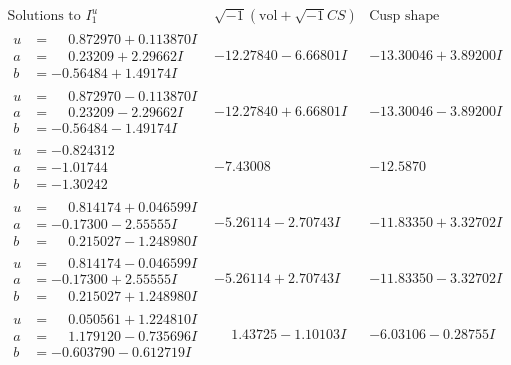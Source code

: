 \documentclass[1p]{elsarticle_modified}
\theoremstyle{definition}
\newcommand{\I}{\sqrt{-1}}
\begin{document}
$$\begin{array}{c|c|c}  
\text{Solutions to }I^u_{1}& \I (\text{vol} + \sqrt{-1}CS) & \text{Cusp shape}\\
 \hline 
\begin{aligned}
u &= \phantom{-}0.872970 + 0.113870 I \\
a &= \phantom{-}0.23209 + 2.29662 I \\
b &= -0.56484 + 1.49174 I\end{aligned}
 & -12.27840 - 6.66801 I & -13.30046 + 3.89200 I \\ \hline\begin{aligned}
u &= \phantom{-}0.872970 - 0.113870 I \\
a &= \phantom{-}0.23209 - 2.29662 I \\
b &= -0.56484 - 1.49174 I\end{aligned}
 & -12.27840 + 6.66801 I & -13.30046 - 3.89200 I \\ \hline\begin{aligned}
u &= -0.824312\phantom{ +0.000000I} \\
a &= -1.01744\phantom{ +0.000000I} \\
b &= -1.30242\phantom{ +0.000000I}\end{aligned}
 & -7.43008\phantom{ +0.000000I} & -12.5870\phantom{ +0.000000I} \\ \hline\begin{aligned}
u &= \phantom{-}0.814174 + 0.046599 I \\
a &= -0.17300 - 2.55555 I \\
b &= \phantom{-}0.215027 - 1.248980 I\end{aligned}
 & -5.26114 - 2.70743 I & -11.83350 + 3.32702 I \\ \hline\begin{aligned}
u &= \phantom{-}0.814174 - 0.046599 I \\
a &= -0.17300 + 2.55555 I \\
b &= \phantom{-}0.215027 + 1.248980 I\end{aligned}
 & -5.26114 + 2.70743 I & -11.83350 - 3.32702 I \\ \hline\begin{aligned}
u &= \phantom{-}0.050561 + 1.224810 I \\
a &= \phantom{-}1.179120 - 0.735696 I \\
b &= -0.603790 - 0.612719 I\end{aligned}
 & \phantom{-}1.43725 - 1.10103 I & -6.03106 - 0.28755 I \\ \hline\begin{aligned}

\end{aligned}
\end{array}$$
\end{document}
